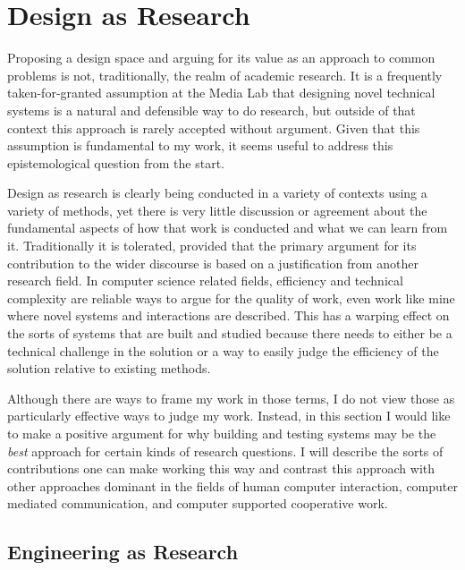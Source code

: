 \section{Design as Research}

Proposing a design space and arguing for its value as an approach to common problems is not, traditionally, the realm of academic research. It is a frequently taken-for-granted assumption at the Media Lab that designing novel technical systems is a natural and defensible way to do research, but outside of that context this approach is rarely accepted without argument. Given that this assumption is fundamental to my work, it seems useful to address this epistemological question from the start.

Design as research is clearly being conducted in a variety of contexts using a variety of methods, yet there is very little discussion or agreement about the fundamental aspects of how that work is conducted and what we can learn from it. Traditionally it is tolerated, provided that the primary argument for its contribution to the wider discourse is based on a justification from another research field. In computer science related fields, efficiency and technical complexity are reliable ways to argue for the quality of work, even work like mine where novel systems and interactions are described. This has a warping effect on the sorts of systems that are built and studied because there needs to either be a technical challenge in the solution or a way to easily judge the efficiency of the solution relative to existing methods.

Although there are ways to frame my work in those terms, I do not view those as particularly effective ways to judge my work. Instead, in this section I would like to make a positive argument for why building and testing systems may be the \emph{best} approach for certain kinds of research questions. I will describe the sorts of contributions one can make working this way and contrast this approach with other approaches dominant in the fields of human computer interaction, computer mediated communication, and computer supported cooperative work.

\subsection{Engineering as Research}

